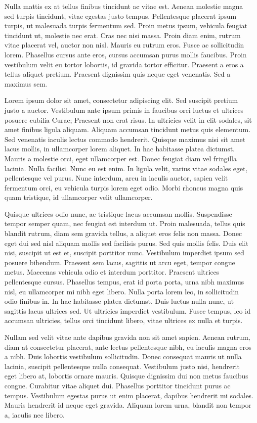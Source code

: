 Nulla mattis ex at tellus finibus tincidunt ac vitae est. Aenean molestie magna sed turpis tincidunt, vitae egestas justo tempus. Pellentesque placerat ipsum turpis, ut malesuada turpis fermentum sed. Proin metus ipsum, vehicula feugiat tincidunt ut, molestie nec erat. Cras nec nisi massa. Proin diam enim, rutrum vitae placerat vel, auctor non nisl. Mauris eu rutrum eros. Fusce ac sollicitudin lorem. Phasellus cursus ante eros, cursus accumsan purus mollis faucibus. Proin vestibulum velit eu tortor lobortis, id gravida tortor efficitur. Praesent a eros a tellus aliquet pretium. Praesent dignissim quis neque eget venenatis. Sed a maximus sem.

Lorem ipsum dolor sit amet, consectetur adipiscing elit. Sed suscipit pretium justo a auctor. Vestibulum ante ipsum primis in faucibus orci luctus et ultrices posuere cubilia Curae; Praesent non erat risus. In ultricies velit in elit sodales, sit amet finibus ligula aliquam. Aliquam accumsan tincidunt metus quis elementum. Sed venenatis iaculis lectus commodo hendrerit. Quisque maximus nisi sit amet lacus mollis, in ullamcorper lorem aliquet. In hac habitasse platea dictumst. Mauris a molestie orci, eget ullamcorper est. Donec feugiat diam vel fringilla lacinia. Nulla facilisi. Nunc eu est enim. In ligula velit, varius vitae sodales eget, pellentesque vel purus. Nunc interdum, arcu in iaculis auctor, sapien velit fermentum orci, eu vehicula turpis lorem eget odio. Morbi rhoncus magna quis quam tristique, id ullamcorper velit ullamcorper.

Quisque ultrices odio nunc, ac tristique lacus accumsan mollis. Suspendisse tempor semper quam, nec feugiat est interdum ut. Proin malesuada, tellus quis blandit rutrum, diam sem gravida tellus, a aliquet eros felis non massa. Donec eget dui sed nisl aliquam mollis sed facilisis purus. Sed quis mollis felis. Duis elit nisi, suscipit ut est et, suscipit porttitor nunc. Vestibulum imperdiet ipsum sed posuere bibendum. Praesent sem lacus, sagittis ut arcu eget, tempor congue metus. Maecenas vehicula odio et interdum porttitor. Praesent ultrices pellentesque cursus. Phasellus tempus, erat id porta porta, urna nibh maximus nisl, eu ullamcorper mi nibh eget libero. Nulla porta lorem leo, in sollicitudin odio finibus in. In hac habitasse platea dictumst. Duis luctus nulla nunc, ut sagittis lacus ultrices sed. Ut ultricies imperdiet vestibulum. Fusce tempus, leo id accumsan ultricies, tellus orci tincidunt libero, vitae ultrices ex nulla et turpis.

Nullam sed velit vitae ante dapibus gravida non sit amet sapien. Aenean rutrum, diam at consectetur placerat, ante lectus pellentesque nibh, eu iaculis magna eros a nibh. Duis lobortis vestibulum sollicitudin. Donec consequat mauris ut nulla lacinia, suscipit pellentesque nulla consequat. Vestibulum justo nisi, hendrerit eget libero at, lobortis ornare mauris. Quisque dignissim dui non metus faucibus congue. Curabitur vitae aliquet dui. Phasellus porttitor tincidunt purus ac tempus. Vestibulum egestas purus ut enim placerat, dapibus hendrerit mi sodales. Mauris hendrerit id neque eget gravida. Aliquam lorem urna, blandit non tempor a, iaculis nec libero.

